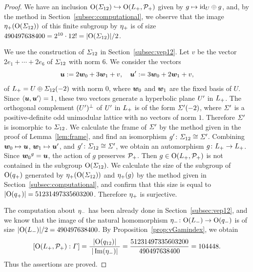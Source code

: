 \documentclass{amsart} %
\begin{document}
\begin{proof}
We have an inclusion $\mathord{\mathrm{O}}(\varSigma_{12})\hookrightarrow \mathord{\mathrm{O}}(L_{+}, \mathord{\mathcal{P}}_{+})$
given by $g\mapsto \mathord{\mathrm{id}}_{U}\oplus g$,
and, by the method in Section~\ref{subsec:computational}, 
we observe that  
 the image ${\eta}_{+}(\mathord{\mathrm{O}}(\varSigma_{12}))$ of this finite subgroup %
by ${\eta}_{+}$ is 
of size $490497638400=2^{10}\cdot 12!=|\mathord{\mathrm{O}}(\varSigma_{12})|/2$.
 \par
 We use the construction of $\varSigma_{12}$ in Section~\ref{subsec:vep12}.
 Let $v$ be the vector $2e_1+\cdots +2e_6$ of $\varSigma_{12}$ with norm $6$.
 We consider the vectors
 \[
 \boldsymbol{u}:=2\boldsymbol{w}_0+ 3\boldsymbol{w}_1+v,
 \quad 
 \boldsymbol{u}^{\prime}:=3\boldsymbol{w}_0+ 2\boldsymbol{w}_1+v,
 \]
 of $L_{+}=U\oplus \varSigma_{12}(-2)$ with norm $0$,
 where $\boldsymbol{w}_0$ and $\boldsymbol{w}_1$ are the fixed basis of $U$. 
Since 
$\langle \boldsymbol{u}, \boldsymbol{u}^{\prime} \rangle=1$, these two vectors 
generate a hyperbolic plane $U^{\prime}$ in $L_{+}$.
 The orthogonal complement $(U^{\prime})^{\perp}$ of $U^{\prime}$ in $L_{+}$
 is of the form $\varSigma^{\prime}(-2)$,
where $\varSigma^{\prime}$ is a positive-definite odd unimodular lattice
with no vectors of norm $1$.
Therefore $\varSigma^{\prime}$ is isomorphic to $\varSigma_{12}$.
We calculate the frame of $\varSigma^{\prime}$ 
by the method given in the proof of Lemma~\ref{lem:frame},
and find an isomorphism $g^{\prime} \colon \varSigma_{12}\cong \varSigma^{\prime}$.
Combining $\boldsymbol{w}_0\mapsto \boldsymbol{u}$, $\boldsymbol{w}_1\mapsto \boldsymbol{u}^{\prime}$,
and $g^{\prime} \colon \varSigma_{12}\cong \varSigma^{\prime}$,
we obtain an automorphism $g\colon L_{+}\to L_{+}$.
Since ${\boldsymbol{w}_0}^g= \boldsymbol{u}$, 
the action of $g$ preserves $\mathord{\mathcal{P}}_{+}$.
Then $g\in \mathord{\mathrm{O}}(L_{+}, \mathord{\mathcal{P}}_{+})$
 is not contained in the subgroup $\mathord{\mathrm{O}}(\varSigma_{12})$.
We calculate the size of the subgroup of $\mathord{\mathrm{O}}(q_{+})$
generated by ${\eta}_{+}(\mathord{\mathrm{O}}(\varSigma_{12}))$ and ${\eta}_{+} (g)$
by the method given in Section~\ref{subsec:computational}, 
and confirm that 
this size is equal to $|\mathord{\mathrm{O}}(q_{+})|=51231497335603200$.
Therefore ${\eta}_{+}$ is surjective.
%
\par
The computation about ${\eta}_{-}$ has been already done in 
Section~\ref{subsec:vep12},
and we know that the image of 
the natural homomorphism 
${\eta}_{-}\colon \mathord{\mathrm{O}}(L_{-}) \to \mathord{\mathrm{O}}(q_{-})$
is of size 
$|\mathord{\mathrm{O}}(L_{-})|/2=490497638400$.
By Proposition~\ref{prop:vGamindex},
we obtain  
\[
[\mathord{\mathrm{O}}(L_{+}, \mathord{\mathcal{P}}_{+}): \varGamma]
= \frac{ |\mathord{\mathrm{O}}(q_{12})|}{\; |\operatorname{Im}({\eta}_{-})|\;}
=
\frac{51231497335603200}{490497638400}
=
104448.
\]
Thus the assertions are proved.
\end{proof}
\end{document}
